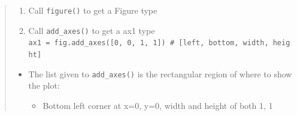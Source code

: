 \documentclass[
]{book}
\providecommand{\tightlist}{%
  \setlength{\itemsep}{0pt}\setlength{\parskip}{0pt}}
\theoremstyle{definition}
\theoremstyle{definition}
\theoremstyle{definition}
\theoremstyle{definition}
\theoremstyle{remark}
\begin{document}
\begin{quote}
\begin{enumerate}
\def\labelenumi{\arabic{enumi}.}
\tightlist
\item
  Call \texttt{figure()} to get a Figure type
\item
  Call \texttt{add\_axes()} to get a ax1 type
  \texttt{ax1\ =\ fig.add\_axes({[}0,\ 0,\ 1,\ 1{]})\ \#\ {[}left,\ bottom,\ width,\ height{]}}
\end{enumerate}

\begin{itemize}
\tightlist
\item
  The list given to \texttt{add\_axes()} is the rectangular region of where to show the plot:

  \begin{itemize}
  \tightlist
  \item
    Bottom left corner at x=0, y=0, width and height of both 1, 1
  \end{itemize}
\end{itemize}
\end{quote}
\end{document}
